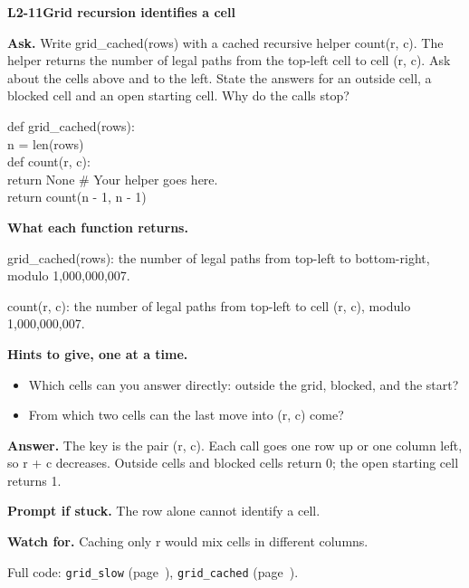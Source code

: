 \documentclass[11pt,a4paper]{article}
\begin{document}
\noindent\begin{minipage}{\textwidth}
{\color{teal}\textbf{L2-11}}\quad \textbf{Grid recursion identifies a cell}\par\smallskip
\textbf{Ask.} Write grid\_cached(rows) with a cached recursive helper count(r, c). The helper returns the number of legal paths from the top-left cell to cell (r, c). Ask about the cells above and to the left. State the answers for an outside cell, a blocked cell and an open starting cell. Why do the calls stop?\par\smallskip
\par{}\par\smallskip\noindent\colorbox{codepaper}{\parbox{\dimexpr\linewidth-2\fboxsep\relax}{\small\ttfamily\raggedright def grid\_cached(rows):\\\hspace*{2.4em}n = len(rows)\\\hspace*{2.4em}def count(r, c):\\\hspace*{4.8em}return None  \# Your helper goes here.\\\hspace*{2.4em}return count(n - 1, n - 1)}}\par
{\small\textbf{What each function returns.}\par grid\_cached(rows): the number of legal paths from top-left to bottom-right, modulo 1,000,000,007.\par count(r, c): the number of legal paths from top-left to cell (r, c), modulo 1,000,000,007.\par }
{\small\textbf{Hints to give, one at a time.}}\begin{itemize}\item Which cells can you answer directly: outside the grid, blocked, and the start?\item From which two cells can the last move into (r, c) come?\end{itemize}
\textbf{Answer.} The key is the pair (r, c). Each call goes one row up or one column left, so r + c decreases. Outside cells and blocked cells return 0; the open starting cell returns 1.\par\smallskip
\textbf{Prompt if stuck.} The row alone cannot identify a cell.\par\smallskip
\textbf{Watch for.} Caching only r would mix cells in different columns.\par\smallskip Full code: \texttt{grid\_slow} (page~\pageref{L2-code-grid_slow}), \texttt{grid\_cached} (page~\pageref{L2-code-grid_cached}).
\end{minipage}\par{}\medskip
\end{document}
